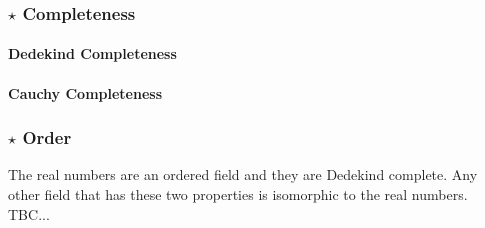 



\subsubsection{$\star$ Completeness}

\paragraph{Dedekind Completeness}








\paragraph{Cauchy Completeness}

\subsubsection{$\star$ Order}
The real numbers are an ordered field and they are Dedekind complete. Any other field that has these two properties is isomorphic to the real numbers. TBC...

